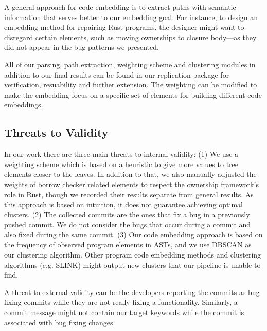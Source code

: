 A general approach for code embedding is to extract paths with semantic information that serves better to our embedding goal. For instance, to design an embedding method for repairing Rust programs, the designer might want to disregard certain elements, such as moving ownerships to closure body---as they did not appear in the bug patterns we presented.

All of our parsing, path extraction, weighting scheme and clustering modules in addition to our final results can be found in our replication package for verification, resuability and further extension. The weighting can be modified to make the embedding focus on a specific set of elements for building different code embeddings.

\subsection{Threats to Validity}

In our work there are three main threats to internal validity: (1) We use a weighting scheme which is based on a heuristic to give more values to tree elements closer to the leaves. In addition to that, we also manually adjusted the weights of borrow checker related elements to respect the ownership framework's role in Rust, though we recorded their results separate from general results. As this approach is based on intuition, it does not guarantee achieving optimal clusters. (2) The collected commits are the ones that fix a bug in a previously pushed commit. We do not consider the bugs that occur during a commit and also fixed during the same commit. (3) Our code embedding approach is based on the frequency of observed program elements in ASTs, and we use DBSCAN as our clustering algorithm. Other program code embedding methods and clustering algorithms (e.g. SLINK) might output new clusters that our pipeline is unable to find. 

A threat to external validity can be the developers reporting the commits as bug fixing commits while they are not really fixing a functionality. Similarly, a commit message might not contain our target keywords while the commit is associated with bug fixing changes.
